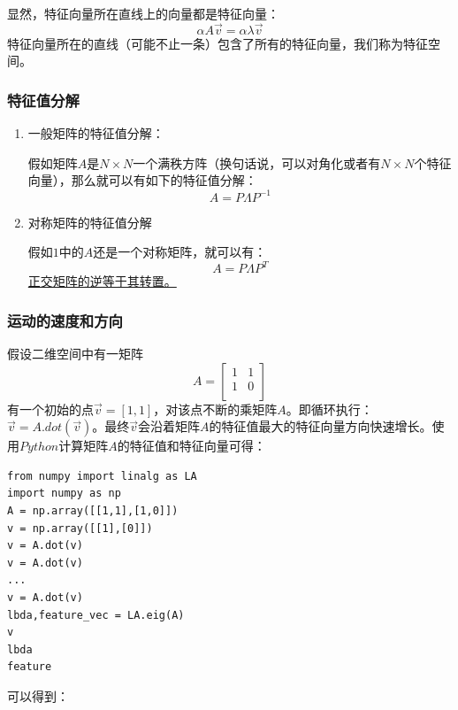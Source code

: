 \documentclass[12pt, letterpaper]{article}
\begin{document}
显然，特征向量所在直线上的向量都是特征向量：
$$
\alpha A\vec{v}=\alpha\lambda\vec{v}
$$
特征向量所在的直线（可能不止一条）包含了所有的特征向量，我们称为特征空间。
\subsubsection*{特征值分解}
\begin{enumerate}
\item 一般矩阵的特征值分解：

假如矩阵$A$是$N\times N$一个满秩方阵（换句话说，可以对角化或者有$N\times N$个特征向量），那么就可以有如下的特征值分解：
\begin{equation}
A = P\Lambda P^{-1}
\end{equation}

\item 对称矩阵的特征值分解

假如$1$中的$A$还是一个对称矩阵，就可以有：
\begin{equation}
A = P\Lambda P^T
\end{equation}
\href{https://zhidao.baidu.com/question/569597844.html}{正交矩阵的逆等于其转置。}
\end{enumerate}



\subsubsection*{运动的速度和方向}
假设二维空间中有一矩阵
$$
A = \left[
\begin{matrix}
1 &1\\
1&0\\
\end{matrix}
\right]
$$
有一个初始的点$\vec{v}=[1,1]$，对该点不断的乘矩阵$A$。即循环执行：
$\vec{v}=A.dot(\vec{v})$。最终$\vec{v}$会沿着矩阵$A$的特征值最大的特征向量方向快速增长。使用$Python$计算矩阵$A$的特征值和特征向量可得：

\begin{lstlisting}[style = Python]
from numpy import linalg as LA
import numpy as np
A = np.array([[1,1],[1,0]])
v = np.array([[1],[0]])
v = A.dot(v)
v = A.dot(v)
...
v = A.dot(v)
lbda,feature_vec = LA.eig(A)
v
lbda
feature
\end{lstlisting}
可以得到：
\end{document}
